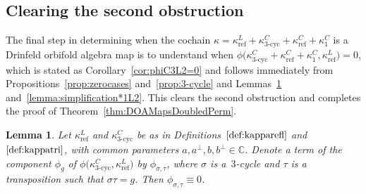 \documentclass[pdftex]{sigma}
\numberwithin{equation}{section}
\newtheorem{Lemma}[Theorem]{Lemma}
\DeclareMathOperator{\refl}{ref}
\DeclareMathOperator{\tri}{3-cyc}
\begin{document}
\subsection{Clearing the second obstruction}%

The final step in determining when the cochain
$\kappa=\kappa^L_{\refl}+\kappa^C_{\tri}+\kappa^C_{\refl}+\kappa^C_1$
is a Drinfeld orbifold algebra map is to understand when
$\phi\big(\kappa^C_{\tri}+\kappa^C_{\refl}+\kappa^C_1,\kappa^L_{\refl}\big)=0$,
which is stated as Corollary~\ref{cor:phiC3L2=0} and follows immediately from
Propositions~\ref{prop:zerocases} and~\ref{prop:3-cycle} and Lemmas~\ref{lemma:simplificationC3L2}
and~\ref{lemma:simplification*1L2}. This clears the second obstruction and
completes the proof of Theorem~\ref{thm:DOAMapsDoubledPerm}.

\begin{Lemma}\label{lemma:simplificationC3L2}
Let $\kappa^L_{\refl}$ and $\kappa^C_{\tri}$ be as in Definitions~$\ref{def:kapparefl}$ and~$\ref{def:kappatri}$,
with common parameters $a, a^\perp, b, b^\perp \in \mathbb{C}$.
Denote a term of the component $\phi_g$ of $\phi\big(\kappa^C_{\tri},\kappa^L_{\refl}\big)$
by $\phi_{\sigma,\tau}$, where $\sigma$ is a~$3$-cycle and
$\tau$ is a transposition such that $\sigma \tau = g$. Then $\phi_{\sigma,\tau} \equiv 0$.
\end{Lemma}
\end{document}
